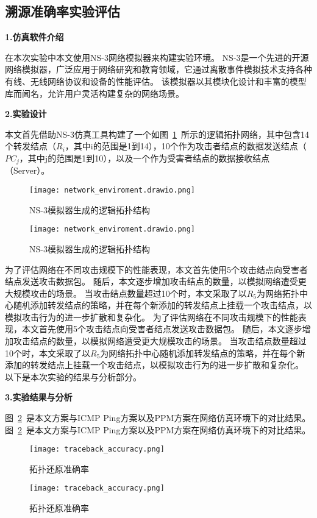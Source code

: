 \begin{enumerate}[a.]
\begin{enumerate}[a.]
\begin{enumerate}[a.]
\begin{enumerate}[a.]
\begin{enumerate}[a.]
\begin{enumerate}[a.]
\begin{enumerate}[a.]
\subsection{溯源准确率实验评估}
\textbf{1.仿真软件介绍}\par
在本次实验中本文使用NS-3网络模拟器来构建实验环境。
NS-3是一个先进的开源网络模拟器，广泛应用于网络研究和教育领域，它通过离散事件模拟技术支持各种有线、无线网络协议和设备的性能评估。
该模拟器以其模块化设计和丰富的模型库而闻名，允许用户灵活构建复杂的网络场景。\par
\textbf{2.实验设计}\par
本文首先借助NS-3仿真工具构建了一个如图~\ref{fig:network_enviroment}~所示的逻辑拓扑网络，其中包含14个转发结点（$R_i$，其中i的范围是1到14），10个作为攻击者结点的数据发送结点（$PC_j$，其中j的范围是1到10），以及一个作为受害者结点的数据接收结点（Server）。
\begin{figure}[h]
	\centering
	\texttt{[image: network\_enviroment.drawio.png]}
	\caption{NS-3模拟器生成的逻辑拓扑结构}
	\label{fig:network_enviroment}
	\centering
	\texttt{[image: network\_enviroment.drawio.png]}
	\caption{NS-3模拟器生成的逻辑拓扑结构}
	\label{fig:network_enviroment}
\end{figure}
为了评估网络在不同攻击规模下的性能表现，本文首先使用5个攻击结点向受害者结点发送攻击数据包。
随后，本文逐步增加攻击结点的数量，以模拟网络遭受更大规模攻击的场景。
当攻击结点数量超过10个时，本文采取了以$R_5$为网络拓扑中心随机添加转发结点的策略，并在每个新添加的转发结点上挂载一个攻击结点，以模拟攻击行为的进一步扩散和复杂化。
为了评估网络在不同攻击规模下的性能表现，本文首先使用5个攻击结点向受害者结点发送攻击数据包。
随后，本文逐步增加攻击结点的数量，以模拟网络遭受更大规模攻击的场景。
当攻击结点数量超过10个时，本文采取了以$R_5$为网络拓扑中心随机添加转发结点的策略，并在每个新添加的转发结点上挂载一个攻击结点，以模拟攻击行为的进一步扩散和复杂化。
以下是本次实验的结果与分析部分。\par
\textbf{3.实验结果与分析}\par
图~\ref{fig:traceback_accuracy}~是本文方案与ICMP Ping方案以及PPM方案在网络仿真环境下的对比结果。
图~\ref{fig:traceback_accuracy}~是本文方案与ICMP Ping方案以及PPM方案在网络仿真环境下的对比结果。
\begin{figure}[h]
	\centering
	\texttt{[image: traceback\_accuracy.png]}
	\caption{拓扑还原准确率}
	\label{fig:traceback_accuracy}
	\centering
	\texttt{[image: traceback\_accuracy.png]}
	\caption{拓扑还原准确率}
	\label{fig:traceback_accuracy}
\end{figure}


\end{enumerate}
\end{enumerate}
\end{enumerate}
\end{enumerate}
\end{enumerate}
\end{enumerate}
\end{enumerate}
